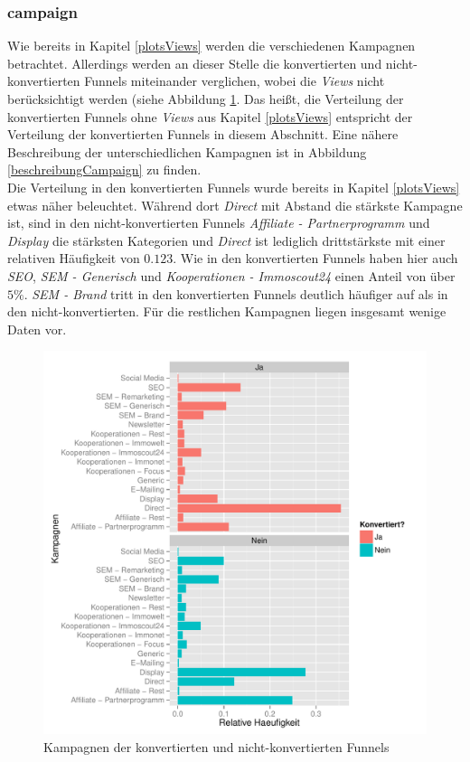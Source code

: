 \subsubsection*{campaign}
Wie bereits in Kapitel \ref{plotsViews} werden die verschiedenen Kampagnen betrachtet. Allerdings werden an dieser Stelle die konvertierten und nicht-konvertierten Funnels miteinander verglichen, wobei die \textit{Views} nicht berücksichtigt werden (siehe Abbildung \ref{campaign}. Das heißt, die Verteilung der konvertierten Funnels ohne \textit{Views} aus Kapitel \ref{plotsViews} entspricht der Verteilung der konvertierten Funnels in diesem Abschnitt. Eine nähere Beschreibung der unterschiedlichen Kampagnen ist in Abbildung \ref{beschreibungCampaign} zu finden.\\
Die Verteilung in den konvertierten Funnels wurde bereits in Kapitel \ref{plotsViews} etwas näher beleuchtet. Während dort \textit{Direct} mit Abstand die stärkste Kampagne ist, sind in den nicht-konvertierten Funnels \textit{Affiliate - Partnerprogramm} und \textit{Display} die stärksten Kategorien und \textit{Direct} ist lediglich drittstärkste mit einer relativen Häufigkeit von $ 0.123 $. Wie in den konvertierten Funnels haben hier auch \textit{SEO}, \textit{SEM - Generisch} und \textit{Kooperationen - Immoscout24} einen Anteil von über $5 \%$. \textit{SEM - Brand} tritt in den konvertierten Funnels deutlich häufiger auf als in den nicht-konvertierten. Für die restlichen Kampagnen liegen insgesamt wenige Daten vor.

\begin{figure}[H]
	\centering
	\includegraphics[scale=0.5]{campaign.pdf}
	\caption{Kampagnen der konvertierten und nicht-konvertierten Funnels}
	\label{campaign}
\end{figure}
    
